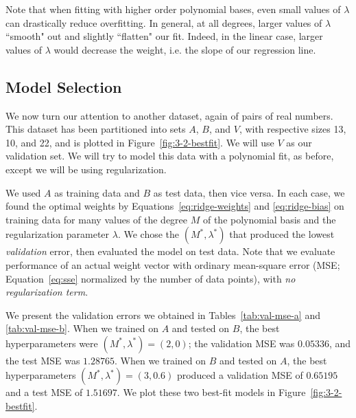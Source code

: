 \documentclass{article}
\begin{document}
\begin{multicols}{2}
Note that when fitting with higher order polynomial bases, even small values of $\lambda$ can drastically reduce overfitting. In general, at all degrees, larger values of $\lambda$ ``smooth" out and slightly ``flatten" our fit. Indeed, in the linear case, larger values of $\lambda$ would decrease the weight, i.e. the slope of our regression line.


\subsection{Model Selection}

We now turn our attention to another dataset, again of pairs of real numbers.
This dataset has been partitioned into sets $A$, $B$, and $V$, with respective sizes 13, 10, and 22, and is plotted in Figure~\ref{fig:3-2-bestfit}.
We will use $V$ as our validation set. We will try to model this data with a polynomial fit, as before, except we will be using regularization.

We used $A$ as training data and $B$ as test data, then vice versa.
In each case, we found the optimal weights by Equations~\ref{eq:ridge-weights} and \ref{eq:ridge-bias} on training data for many values of the degree $M$ of the polynomial basis and the regularization parameter $\lambda$. We chose the $(M^*, \lambda^*)$ that produced the lowest \emph{validation} error, then evaluated the model on test data.
Note that we evaluate performance of an actual weight vector with ordinary mean-square error (MSE; Equation~\ref{eq:sse} normalized by the number of data points), with \emph{no regularization term}.

We present the validation errors we obtained in Tables~\ref{tab:val-mse-a} and \ref{tab:val-mse-b}.
When we trained on $A$ and tested on $B$, the best hyperparameters were $(M^*,\lambda^*)=(2,0)$; the validation MSE was $0.05336$, and the test MSE was $1.28765$.
When we trained on $B$ and tested on $A$, the best hyperparameters $(M^*,\lambda^*)=(3,0.6)$ produced a validation MSE of $0.65195$ and a test MSE of $1.51697$.
We plot these two best-fit models in Figure~\ref{fig:3-2-bestfit}.



\end{multicols}
\end{document}
